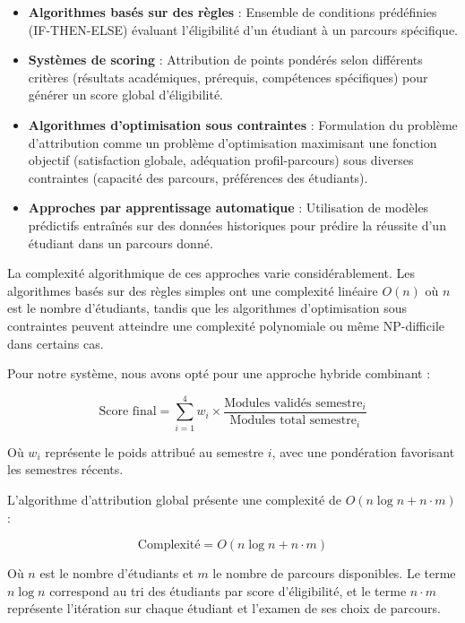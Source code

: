 \documentclass[french,12pt]{report} %
\begin{document}
\begin{itemize}
    \item \textbf{Algorithmes basés sur des règles} : Ensemble de conditions prédéfinies (IF-THEN-ELSE) évaluant l'éligibilité d'un étudiant à un parcours spécifique.
    
    \item \textbf{Systèmes de scoring} : Attribution de points pondérés selon différents critères (résultats académiques, prérequis, compétences spécifiques) pour générer un score global d'éligibilité.
    
    \item \textbf{Algorithmes d'optimisation sous contraintes} : Formulation du problème d'attribution comme un problème d'optimisation maximisant une fonction objectif (satisfaction globale, adéquation profil-parcours) sous diverses contraintes (capacité des parcours, préférences des étudiants).
    
    \item \textbf{Approches par apprentissage automatique} : Utilisation de modèles prédictifs entraînés sur des données historiques pour prédire la réussite d'un étudiant dans un parcours donné.
\end{itemize}

La complexité algorithmique de ces approches varie considérablement. Les algorithmes basés sur des règles simples ont une complexité linéaire $O(n)$ où $n$ est le nombre d'étudiants, tandis que les algorithmes d'optimisation sous contraintes peuvent atteindre une complexité polynomiale ou même NP-difficile dans certains cas.

Pour notre système, nous avons opté pour une approche hybride combinant :

\begin{equation}
\text{Score final} = \sum_{i=1}^{4} w_i \times \frac{\text{Modules validés semestre}_i}{\text{Modules total semestre}_i}
\end{equation}

Où $w_i$ représente le poids attribué au semestre $i$, avec une pondération favorisant les semestres récents.

L'algorithme d'attribution global présente une complexité de $O(n \log n + n \cdot m)$ :

\begin{equation}
\text{Complexité} = O(n \log n + n \cdot m)
\end{equation}

Où $n$ est le nombre d'étudiants et $m$ le nombre de parcours disponibles. Le terme $n \log n$ correspond au tri des étudiants par score d'éligibilité, et le terme $n \cdot m$ représente l'itération sur chaque étudiant et l'examen de ses choix de parcours.
\end{document}
